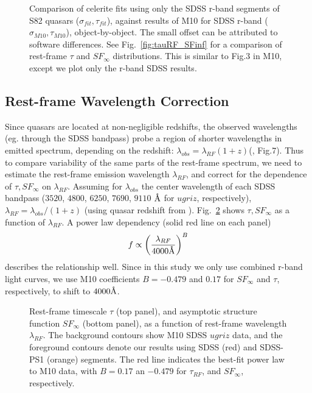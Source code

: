 \documentclass[twocolumn]{aastex62}
\let\oldAA\AA
\renewcommand{\AA}{\text{\normalfont\oldAA}}
\newcommand{\project}[1]{\textsf{#1}}
\begin{document}
\begin{figure} %
\caption{Comparison of \project{celerite} fits using only the  SDSS r-band segments of S82 quasars ($\sigma_{fit}, \tau_{fit}$), against results of M10 for SDSS r-band ($\sigma_{M10}, \tau_{M10}$), object-by-object. The small offset can be attributed to software differences. See Fig.~\ref{fig:tauRF_SFinf} for a comparison of rest-frame $\tau$ and $SF_{\infty}$ distributions. This is similar to Fig.3 in M10, except we plot only the r-band SDSS results.}
\label{fig:celeriteCompare}
\end{figure} 


\subsection{Rest-frame Wavelength Correction}
Since quasars are located at non-negligible redshifts, the observed wavelengths (eg. through the SDSS bandpass) probe a region of shorter wavelengths in emitted spectrum, depending on the redshift:  $\lambda_{obs} = \lambda_{RF}  (1+z)$(\citealt{shen2018}, Fig.7). Thus to compare variability of the same parts of the rest-frame spectrum, we need to estimate the rest-frame emission wavelength $\lambda_{RF}$, and correct for the dependence of $\tau, SF_{\infty}$ on $\lambda_{RF}$. Assuming for $\lambda_{obs}$ the center wavelength of each SDSS bandpass ($3520$, $4800$, $6250$, $7690$, $9110$ $\mbox{\AA}$ for $ugriz$, respectively), $\lambda_{RF} = \lambda_{obs} / (1+z)$ (using quasar redshift from \citealt{schneider2010}). Fig.~\ref{fig:wavelength_dependence} shows $\tau, SF_{\infty}$  as a function of  $\lambda_{RF}$. A power law dependency (solid red line on each panel)
\begin{equation}
f \propto \left( \frac{\lambda_{RF}}{4000 \mbox{\AA}} \right)^{B}
\end{equation}
describes the relationship well. Since in this study we only use combined r-band light curves,  we use M10 coefficients $B=-0.479$ and $0.17$ for $SF_{\infty}$ and $\tau$, respectively, to shift to $4000 \mbox{\AA}$. 

  
\begin{figure} %
\caption{Rest-frame timescale $\tau$ (top panel), and asymptotic structure function $SF_{\infty}$ (bottom panel), as a function of rest-frame wavelength $\lambda_{RF}$. The background contours show M10 SDSS $ugriz$ data, and the foreground contours  denote our results using  SDSS (red) and SDSS-PS1 (orange) segments. The red line indicates the best-fit power law to M10 data, with $B=0.17$ an $-0.479$ for $\tau_{RF}$, and $SF_{\infty}$, respectively.}
\label{fig:wavelength_dependence}
\end{figure} 
\end{document}
